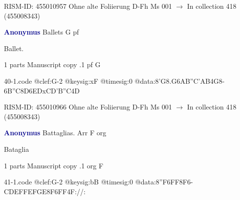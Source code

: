 \documentclass[twocolumn]{book}
\begin{document}
\newline RISM-ID: 455010957
\newline Ohne alte Foliierung
\newline D-Fh  Ms 001
\newline $\rightarrow$ In collection 418 (455008343)

\newline \par \vspace{7pt} \textcolor{darkblue}{\textbf{Anonymus  }}
\newline Ballets  G  
\newline pf
\newline \begin{itshape}[f.85v, at left:] Ballet.\end{itshape} 
\newline \textcolor{darkblue}{}  1 parts  
\newline Manuscript copy
.1  pf  G  
\begin{filecontents*}{40-1.code}
@clef:G-2
@keysig:xF
@timesig:0
@data:8'G{8.G6A}{B''C'AB}4G8-{6B''C}{8D6ED}{xCD'B''C}4D
\end{filecontents*}
\newline
%

\newline RISM-ID: 455010966
\newline Ohne alte Foliierung
\newline D-Fh  Ms 001
\newline $\rightarrow$ In collection 418 (455008343)

\newline \par \vspace{7pt} \textcolor{darkblue}{\textbf{Anonymus  }}
\newline Battaglias. Arr  F  
\newline org
\newline \begin{itshape}[f.81v, at left:] Bataglia\end{itshape} 
\newline \textcolor{darkblue}{}  1 parts  
\newline Manuscript copy
.1  org  F  
\begin{filecontents*}{41-1.code}
@clef:G-2
@keysig:bB
@timesig:0
@data:{8''F6FF}8F6-C{DEFF}{EFGE}{8F6FF}4F://:
\end{filecontents*}
\newline
%
\end{document}
